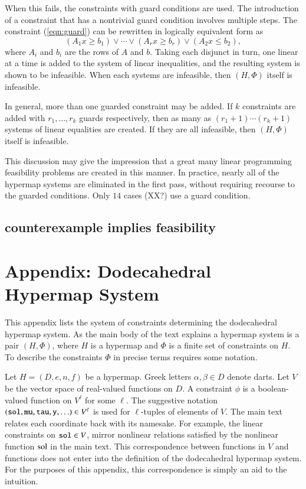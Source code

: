 When this fails, the constraints with guard conditions are
used.
The introduction of a constraint that has a nontrivial guard condition
involves multiple steps.  
The constraint (\ref{eqn:guard}) can be rewritten in logically
equivalent form as
  $$
   (A_{1} x \ge b_{1}) \lor \cdots \lor
   (A_{r} x \ge b_{r}) \lor (A_2 x \le b_2),
  $$
where $A_{i}$ and $b_{i}$ are the rows of $A$ and $b$.
Taking each disjunct in turn, one linear at a time
is added to the system
of linear inequalities, and the resulting system is shown to be
infeasible.  When each
systems are infeasible, then $(H,\Phi)$ itself is infeasible.

In general, more than one guarded constraint may be added.  If
$k$ constraints are added with $r_1,\ldots,r_k$ guards
respectively, then as many as $(r_1+1)\cdots (r_k+1)$ systems
of linear equalities are created.  If they are all infeasible,
then $(H,\Phi)$ itself is infeasible.

This discussion may give the impression 
that a great many linear programming feasibility
problems are created in this manner.  In practice, nearly all
of the hypermap systems are eliminated in the first pass, without
requiring recourse to the guarded conditions.  Only
$14$ cases (XX?) use a guard condition.



\subsection{counterexample implies feasibility}




\section{Appendix: Dodecahedral Hypermap System}

This appendix  lists the system of constraints determining
the dodecahedral hypermap system.  As the main body of the text explains
a hypermap system is a pair $(H,\Phi)$, where $H$ is a hypermap
and $\Phi$ is a finite set of constraints on $H$.  To describe
the constraints $\Phi$ in precise terms requires some notation.

Let $H=(D,e,n,f)$ be a hypermap.   Greek letters
$\alpha,\beta \in D$ denote darts.  Let $V$ be the vector space 
of real-valued  functions on $D$.  A constraint $\phi$ is a boolean-valued function on $V^\ell$ for some $\ell$.  The suggestive
notation $({\operatorname{{\texttt{sol}}}},{\operatorname{{\texttt{mu}}}},{\operatorname{{\texttt{tau}}}},{\operatorname{{\texttt{y}}}},\ldots)\in V^\ell$  is used for $\ell$-tuples
of elements of $V$.  The main text relates each coordinate back
with its namesake.  For example, the linear constraints on
${\operatorname{{\texttt{sol}}}}\in V$, mirror  nonlinear relations satisfied by the
nonlinear function $\operatorname{sol}$ in the main text.  This correspondence
between functions in $V$ and functions does not enter into the
definition of the dodecahedral hypermap system.  For the purposes of this
appendix, this correspondence is simply an aid to the
intuition.

